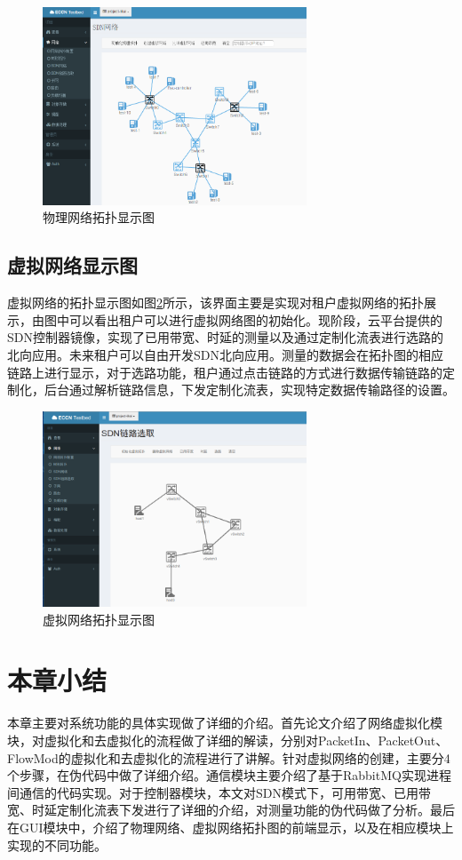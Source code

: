 \begin{figure}[!htb]
  \centering
  \includegraphics[width=0.7\textwidth]{logo/physicalnet.png}
  \caption{物理网络拓扑显示图}
  \label{fig:physicalnet}
\end{figure}

\subsection{虚拟网络显示图}
虚拟网络的拓扑显示图如图\ref{fig:virtualnet}所示，该界面主要是实现对租户虚拟网络的拓扑展示，由图中可以看出租户可以进行虚拟网络图的初始化。现阶段，云平台提供的SDN控制器镜像，实现了已用带宽、时延的测量以及通过定制化流表进行选路的北向应用。未来租户可以自由开发SDN北向应用。测量的数据会在拓扑图的相应链路上进行显示，对于选路功能，租户通过点击链路的方式进行数据传输链路的定制化，后台通过解析链路信息，下发定制化流表，实现特定数据传输路径的设置。

\begin{figure}[!htb]
  \centering
  \includegraphics[width=0.7\textwidth]{logo/virtualnet.png}
  \caption{虚拟网络拓扑显示图}
  \label{fig:virtualnet}
\end{figure}

\section{本章小结}
本章主要对系统功能的具体实现做了详细的介绍。首先论文介绍了网络虚拟化模块，对虚拟化和去虚拟化的流程做了详细的解读，分别对PacketIn、PacketOut、FlowMod的虚拟化和去虚拟化的流程进行了讲解。针对虚拟网络的创建，主要分4个步骤，在伪代码中做了详细介绍。通信模块主要介绍了基于RabbitMQ实现进程间通信的代码实现。对于控制器模块，本文对SDN模式下，可用带宽、已用带宽、时延定制化流表下发进行了详细的介绍，对测量功能的伪代码做了分析。最后在GUI模块中，介绍了物理网络、虚拟网络拓扑图的前端显示，以及在相应模块上实现的不同功能。
